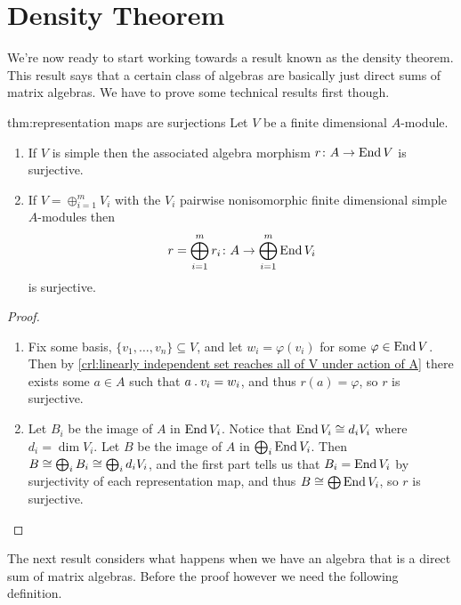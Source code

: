 \section{Density Theorem}
We're now ready to start working towards a result known as the density theorem.
This result says that a certain class of algebras are basically just direct sums of matrix algebras.
We have to prove some technical results first though.

\begin{thm}{}{thm:representation maps are surjections}
    Let \(V\) be a finite dimensional \(A\)-module.
    \begin{enumerate}
        \item If \(V\) is simple then the associated algebra morphism \(r \colon A \to \operatorname{End} V\) is surjective.
        \item If \(V = \oplus_{i=1}^m V_i\) with the \(V_i\) pairwise nonisomorphic finite dimensional simple \(A\)-modules then
        \begin{equation}
            r = \bigoplus_{i=1}^m r_i \colon A \to \bigoplus_{i=1}^m \operatorname{End} V_i
        \end{equation}
        is surjective.
    \end{enumerate}
    \begin{proof}
        \begin{enumerate}
            \item Fix some basis, \(\{v_1, \dotsc, v_n\} \subseteq V\), and let \(w_i = \varphi(v_i)\) for some \(\varphi \in \operatorname{End} V\).
            Then by \cref{crl:linearly independent set reaches all of V under action of A} there exists some \(a \in A\) such that \(a \mathbin{.} v_i = w_i\), and thus \(r(a) = \varphi\), so \(r\) is surjective.
            \item Let \(B_i\) be the image of \(A\) in \(\operatorname{End} V_i\).
            Notice that \(\operatorname{End} V_i \cong d_i V_i\) where \(d_i = \dim V_i\).
            Let \(B\) be the image of \(A\) in \(\bigoplus_i \operatorname{End} V_i\).
            Then \(B \cong \bigoplus_i B_i \cong \bigoplus_i d_i V_i\), and the first part tells us that \(B_i = \operatorname{End} V_i\) by surjectivity of each representation map, and thus \(B \cong \bigoplus \operatorname{End} V_i\), so \(r\) is surjective.
        \end{enumerate}
    \end{proof}
\end{thm}

The next result considers what happens when we have an algebra that is a direct sum of matrix algebras.
Before the proof however we need the following definition.

